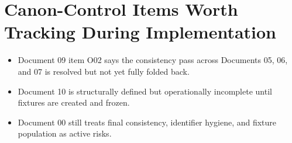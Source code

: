 \documentclass[11pt]{article}
\begin{document}
\section{Canon-Control Items Worth Tracking During Implementation}
\label{sec:org9e7b182}
\begin{itemize}
\item Document 09 item O02 says the consistency pass across Documents 05, 06, and 07 is resolved but not yet fully folded back.
\item Document 10 is structurally defined but operationally incomplete until fixtures are created and frozen.
\item Document 00 still treats final consistency, identifier hygiene, and fixture population as active risks.
\end{itemize}
\end{document}
